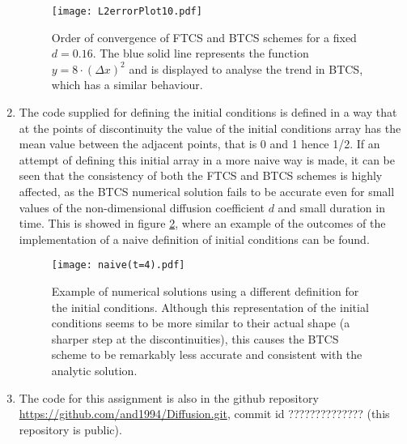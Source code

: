 \documentclass[12pt]{article}
\begin{document}
\begin{enumerate}
\begin{figure}[!tbh]
\centering
\texttt{[image: L2errorPlot10.pdf]}

\caption{Order of convergence of FTCS and BTCS schemes for a fixed $d=0.16$. The blue solid line represents the function $y=8\cdot(\Delta x)^2$ and is displayed to analyse the trend in BTCS, which has a similar behaviour.
\label{fig:Q5}}
\end{figure}

\item The code supplied for defining the initial conditions is defined in a way that at the points of discontinuity the value of the initial conditions array has the mean value between the adjacent points, that is 0 and 1 hence 1/2. If an attempt of defining this initial array in a more naive way is made, it can be seen that the consistency of both the FTCS and BTCS schemes is highly affected, as the BTCS numerical solution fails to be accurate even for small values of the non-dimensional diffusion coefficient $d$ and small duration in time. This is showed in figure \ref{fig:Q6}, where an example of the outcomes of the implementation of a naive definition of initial conditions can be found.

\begin{figure}[!tbh]
\centering
\texttt{[image: naive(t=4).pdf]}

\caption{Example of numerical solutions using a different definition for the initial conditions. Although this representation of the initial conditions seems to be more similar to their actual shape (a sharper step at the discontinuities), this causes the BTCS scheme to be remarkably less accurate and consistent with the analytic solution.}
\label{fig:Q6}
\end{figure}

\item The code for this assignment is also in the github repository\\
\url{https://github.com/and1994/Diffusion.git}, commit id ?????????????? (this repository is public).


\end{enumerate}
\end{document}
